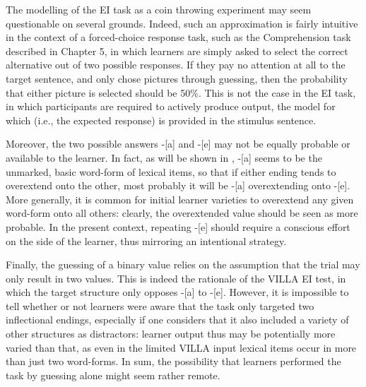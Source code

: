 The modelling of the EI task as a coin throwing experiment may seem questionable on several grounds. Indeed, such an approximation is fairly intuitive in the context of a forced-choice response task, such as the Comprehension task described in Chapter 5, in which learners are simply asked to select the correct alternative out of two possible responses. If they pay no attention at all to the target sentence, and only chose pictures through guessing, then the probability that either picture is selected should be 50\%. This is not the case in the EI task, in which participants are required to actively produce output, the model for which (i.e., the expected response) is provided in the stimulus sentence. 

Moreover, the two possible answers -[a] and -[e] may not be equally probable or available to the learner. In fact, as will be shown in , -[a] seems to be the unmarked, basic word-form of lexical items, so that if either ending tends to overextend onto the other, most probably it will be -[a] overextending onto -[e]. More generally, it is common for initial learner varieties to overextend any given word-form onto all others: clearly, the overextended value should be seen as more probable. In the present context, repeating -[e] should require a conscious effort on the side of the learner, thus mirroring an intentional strategy.

Finally, the guessing of a binary value relies on the assumption that the trial may only result in two values. This is indeed the rationale of the VILLA EI test, in which the target structure only opposes -[a] to -[e]. However, it is impossible to tell whether or not learners were aware that the task only targeted two inflectional endings, especially if one considers that it also included a variety of other structures as distractors: learner output thus may be potentially more varied than that, as even in the limited VILLA input lexical items occur in more than just two word-forms. In sum, the possibility that learners performed the task by guessing alone might seem rather remote.

